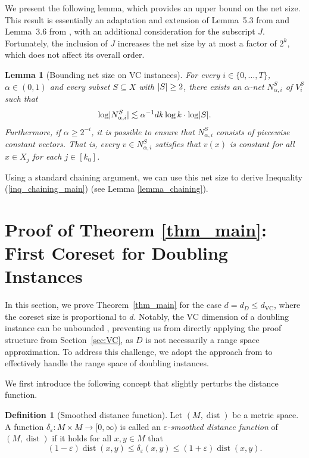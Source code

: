 \documentclass[11pt,letterpaper]{article}
\newtheorem{lemma}[theorem]{Lemma}
\theoremstyle{definition}
\newtheorem{definition}[theorem]{Definition}
\newcommand{\eps}{\varepsilon}
\newcommand{\VC}{\ensuremath{\mathrm{VC}}}
\DeclareMathOperator{\dist}{dist}
\DeclarePairedDelimiter{\abs}{\lvert}{\rvert}
\begin{document}
We present the following lemma, which provides an upper bound on the net size.  
%
This result is essentially an adaptation and extension of Lemma~5.3 from \cite{huang2025coresets} and Lemma~3.6 from \cite{Cohen25}, with an additional consideration for the subscript \( J \).  
%
Fortunately, the inclusion of \( J \) increases the net size by at most a factor of \( 2^k \), which does not affect its overall order.

\begin{lemma}[Bounding net size on VC instances] 
\label{lemma_netsize_main}
For every $i\in \{0,\dots,T\}$, $\alpha\in (0,1)$ and every subset $S\subseteq X$ with $\abs{S}\geq 2$, there exists an $\alpha$-net $N^S_{\alpha,i}$ of $V^S_i$ such that
\[
\log \abs[big]{N^S_{\alpha,i}} \lesssim \alpha^{-1}d k\log k \cdot \log\abs{S}.
\]
Furthermore, if $\alpha\geq 2^{-i}$, it is possible to ensure that $N_{\alpha,i}^S$ consists of piecewise constant vectors. That is, every $v\in N_{\alpha,i}^S$ satisfies that $v(x)$ is constant for all $x\in X_j$ for each $j\in [k_0]$.
\end{lemma}

Using a standard chaining argument, we can use this net size to derive Inequality (\ref{inq_chaining_main}) (see Lemma \ref{lemma_chaining}).
\section{Proof of Theorem \ref{thm_main}: First Coreset for Doubling Instances} \label{sec:Doubling}
%

In this section, we prove Theorem~\ref{thm_main} for the case \( d = d_D \leq d_{\VC} \), where the coreset size is proportional to \( d \).  
%
Notably, the VC dimension of a doubling instance can be unbounded \cite{huang2018epsilon}, preventing us from directly applying the proof structure from Section~\ref{sec:VC}, as \( D \) is not necessarily a range space approximation.  
%
To address this challenge, we adopt the approach from \cite{huang2018epsilon} to effectively handle the range space of doubling instances.

We first introduce the following concept that slightly perturbs the distance function. 

\begin{definition}[Smoothed distance function]
\label{def:eps_smooth}
Let $(M,\dist)$ be a metric space. A function $\delta_\eps: M\times M \rightarrow [0,\infty)$ is called an \emph{$\eps$-smoothed distance function} of $(M,\dist)$ if it holds for all $x,y \in M$ that
\[
    (1-\eps ) \dist (x,y) \leq \delta_\eps(x,y)\leq (1+\eps)\dist(x,y).
\]
\end{definition}
\end{document}
